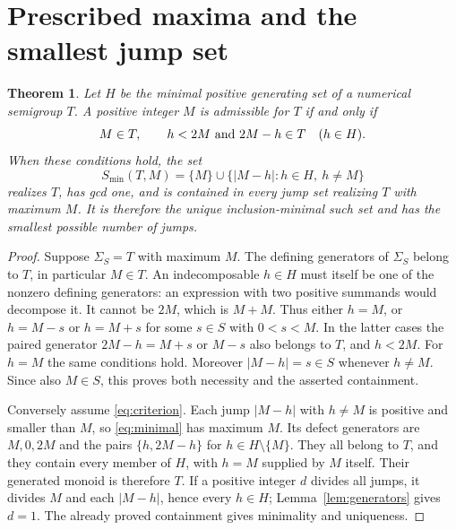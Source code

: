 \documentclass[11pt]{article}
\newtheorem{theorem}{Theorem}
\begin{document}
\section{Prescribed maxima and the smallest jump set}
\begin{theorem}\label{thm:criterion}
Let $H$ be the minimal positive generating set of a numerical semigroup
$T$. A positive integer $M$ is admissible for $T$ if and only if
\begin{equation}\label{eq:criterion}
 M\in T,\qquad h<2M\ \hbox{and}\ 2M-h\in T\quad(h\in H).
\end{equation}
When these conditions hold, the set
\begin{equation}\label{eq:minimal}
 S_{\min}(T,M)=\{M\}\cup\{|M-h|:h\in H,\ h\ne M\}
\end{equation}
realizes $T$, has gcd one, and is contained in every jump set realizing
$T$ with maximum $M$. It is therefore the unique inclusion-minimal such
set and has the smallest possible number of jumps.
\end{theorem}
\begin{proof}
Suppose $\Sigma_S=T$ with maximum $M$. The defining generators of
$\Sigma_S$ belong to $T$, in particular $M\in T$.
An indecomposable $h\in H$ must itself be one of the nonzero defining
generators: an expression with two positive summands would decompose it.
It cannot be $2M$, which is $M+M$. Thus either $h=M$, or
$h=M-s$ or $h=M+s$ for some $s\in S$ with $0<s<M$.
In the latter cases the paired generator $2M-h=M+s$ or $M-s$
also belongs to $T$, and $h<2M$. For $h=M$ the same conditions hold.
Moreover $|M-h|=s\in S$ whenever $h\ne M$. Since also $M\in S$,
this proves both necessity and the asserted containment.

Conversely assume \eqref{eq:criterion}. Each jump $|M-h|$ with $h\ne M$
is positive and smaller than $M$, so \eqref{eq:minimal} has maximum $M$.
Its defect generators are $M,0,2M$ and the pairs
$\{h,2M-h\}$ for $h\in H\setminus\{M\}$.
They all belong to $T$, and they contain every member of $H$,
with $h=M$ supplied by $M$ itself. Their generated monoid is therefore $T$.
If a positive integer $d$ divides all jumps, it divides $M$ and
each $|M-h|$, hence every $h\in H$; Lemma~\ref{lem:generators} gives $d=1$.
The already proved containment gives minimality and uniqueness.
\end{proof}
\end{document}
